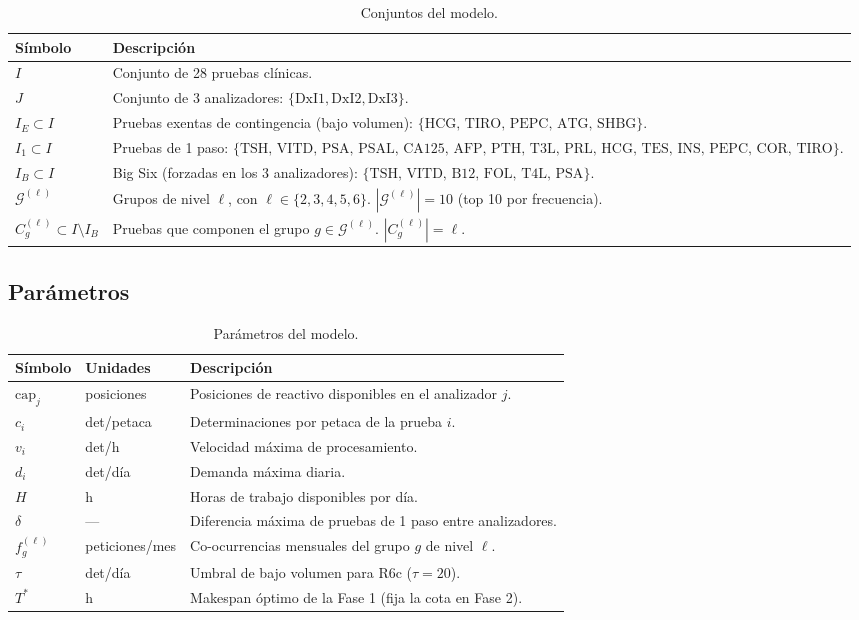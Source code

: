 \documentclass[12pt, a4paper]{article}
\begin{document}
\begin{table}[H]
\centering
\caption{Conjuntos del modelo.}
\begin{tabularx}{\linewidth}{lX}
\toprule
\textbf{Símbolo} & \textbf{Descripción} \\
\midrule
$I$ & Conjunto de 28 pruebas clínicas. \\
$J$ & Conjunto de 3 analizadores: $\{\text{DxI1},\text{DxI2},\text{DxI3}\}$. \\
$I_E \subset I$ & Pruebas exentas de contingencia (bajo volumen): $\{\text{HCG, TIRO, PEPC, ATG, SHBG}\}$. \\
$I_1 \subset I$ & Pruebas de 1 paso: $\{\text{TSH, VITD, PSA, PSAL, CA125, AFP, PTH, T3L, PRL, HCG, TES, INS, PEPC, COR, TIRO}\}$. \\
$I_B \subset I$ & Big Six (forzadas en los 3 analizadores): $\{\text{TSH, VITD, B12, FOL, T4L, PSA}\}$. \\
$\mathcal{G}^{(\ell)}$ & Grupos de nivel $\ell$, con $\ell \in \{2,3,4,5,6\}$. $|\mathcal{G}^{(\ell)}| = 10$ (top 10 por frecuencia). \\
$C_g^{(\ell)} \subset I \setminus I_B$ & Pruebas que componen el grupo $g \in \mathcal{G}^{(\ell)}$. $|C_g^{(\ell)}| = \ell$. \\
\bottomrule
\end{tabularx}
\end{table}

\subsection{Parámetros}

\begin{table}[H]
\centering
\caption{Parámetros del modelo.}
\begin{tabularx}{\linewidth}{llX}
\toprule
\textbf{Símbolo} & \textbf{Unidades} & \textbf{Descripción} \\
\midrule
$\text{cap}_j$ & posiciones & Posiciones de reactivo disponibles en el analizador $j$. \\
$c_i$ & det/petaca & Determinaciones por petaca de la prueba $i$. \\
$v_i$ & det/h & Velocidad máxima de procesamiento. \\
$d_i$ & det/día & Demanda máxima diaria. \\
$H$ & h & Horas de trabajo disponibles por día. \\
$\delta$ & --- & Diferencia máxima de pruebas de 1 paso entre analizadores. \\
$f_g^{(\ell)}$ & peticiones/mes & Co-ocurrencias mensuales del grupo $g$ de nivel $\ell$. \\
$\tau$ & det/día & Umbral de bajo volumen para R6c ($\tau = 20$). \\
$T^*$ & h & Makespan óptimo de la Fase 1 (fija la cota en Fase 2). \\
\bottomrule
\end{tabularx}
\end{table}
\end{document}
